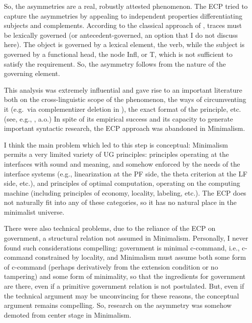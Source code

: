 \documentclass[output=paper]{langsci/langscibook}
\begin{document}
\ea%
    \label{ex:21.3}
    \z
\z
%
So, the asymmetries are a real, robustly attested phenomenon. The \gls{ECP}
tried to capture the asymmetries by appealing to independent properties
differentiating subjects and complements. According to the classical approach
of \citet{Chomsky1981}, traces must be lexically governed (or
antecedent-governed, an option that I do not discuss here). The object is
governed by a lexical element, the verb, while the subject is governed by a
functional head, the node Infl, or T, which is not sufficient to satisfy the
requirement. So, the asymmetry follows from the nature of the governing
element.\largerpage

This analysis was extremely influential and gave rise to an important
literature both on the cross-linguistic scope of the phenomenon, the ways of
circumventing it (e.g.\ via complementizer deletion in ), the exact
format of the principle, etc. (see, e.g.,
\citealt{Pesetsky1982,Kayne1984,Rizzi:1982,Rizzi1990}, a.o.) In spite of its
empirical success and its capacity to generate important syntactic research,
the \gls{ECP} approach was abandoned in Minimalism.

I think the main problem which led to this step is conceptual: Minimalism
permits a very limited variety of \gls{UG} principles:
principles operating at the interfaces with sound and meaning, and somehow
enforced by the needs of the interface systems (e.g., linearization at the
\gls{PF} side, the theta criterion at the LF side, etc.), and
principles of optimal computation, operating on the computing machine
(including principles of economy, locality, labeling, etc.). The
\gls{ECP} does not naturally fit into any of these
categories, so it has no natural place in the minimalist universe.

There were also technical problems, due to the reliance of the \gls{ECP} on
government, a structural relation not assumed in Minimalism. Personally, I
never found such considerations compelling: government is minimal c-command,
i.e., c-command constrained by locality, and Minimalism must assume both some
form of c-command (perhaps derivatively from the extension condition or no
tampering) and some form of minimality, so that the ingredients for government
are there, even if a primitive government relation is not postulated. But, even
if the technical argument may be unconvincing for these reasons, the conceptual
argument remains compelling. So, research on the asymmetry was somehow demoted
from center stage in Minimalism.
\end{document}
